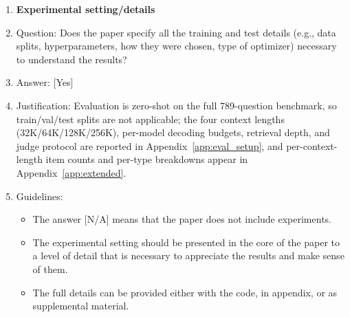 \documentclass{llmxive}
\providecommand{\answerYes}[1][]{[Yes]#1}
\providecommand{\answerNA}[1][]{[N/A]#1}
\begin{document}
\begin{enumerate}
\item {\bf Experimental setting/details}
    \item[] Question: Does the paper specify all the training and test details (e.g., data splits, hyperparameters, how they were chosen, type of optimizer) necessary to understand the results?
    \item[] Answer: \answerYes{}
    \item[] Justification: Evaluation is zero-shot on the full 789-question benchmark, so train/val/test splits are not applicable; the four context lengths (32K/64K/128K/256K), per-model decoding budgets, retrieval depth, and judge protocol are reported in Appendix~\ref{app:eval_setup}, and per-context-length item counts and per-type breakdowns appear in Appendix~\ref{app:extended}.
    \item[] Guidelines:
    \begin{itemize}
        \item The answer \answerNA{} means that the paper does not include experiments.
        \item The experimental setting should be presented in the core of the paper to a level of detail that is necessary to appreciate the results and make sense of them.
        \item The full details can be provided either with the code, in appendix, or as supplemental material.
    \end{itemize}


\end{enumerate}
\end{document}
